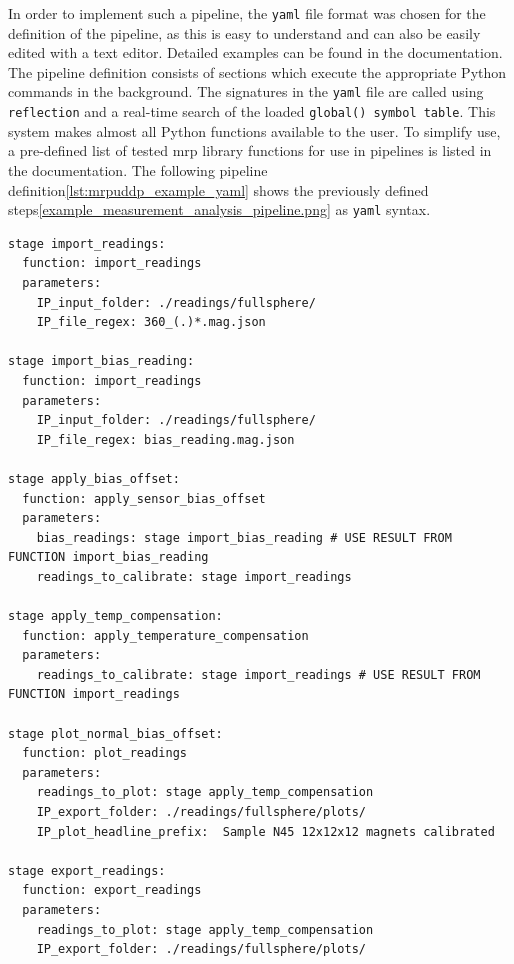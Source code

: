 In order to implement such a pipeline, the
\passthrough{\lstinline!yaml!} file format was chosen for the definition
of the pipeline, as this is easy to understand and can also be easily
edited with a text editor. Detailed examples can be found in the
documentation\cite{MagneticReadoutProcessingReadTheDocs}. The
pipeline definition consists of sections which execute the appropriate
Python commands in the background. The signatures in the
\passthrough{\lstinline!yaml!} file are called using
\passthrough{\lstinline!reflection!} and a real-time search of the
loaded
\passthrough{\lstinline!global() symbol table!}\cite{PythonGlobalSymbolTable}.
This system makes almost all Python functions available to the user. To
simplify use, a pre-defined list of tested \gls{mrp} library functions
for use in pipelines is listed in the
documentation\cite{MagneticReadoutProcessingReadTheDocs}. The
following pipeline definition\ref{lst:mrpuddp_example_yaml} shows the
previously defined steps\ref{example_measurement_analysis_pipeline.png}
as \passthrough{\lstinline!yaml!} syntax.

\begin{lstlisting}[caption={Example User Defined Processing Pipeline}, label=lst:mrpuddp_example_yaml]
stage import_readings:
  function: import_readings
  parameters:
    IP_input_folder: ./readings/fullsphere/
    IP_file_regex: 360_(.)*.mag.json

stage import_bias_reading:
  function: import_readings
  parameters:
    IP_input_folder: ./readings/fullsphere/
    IP_file_regex: bias_reading.mag.json

stage apply_bias_offset:
  function: apply_sensor_bias_offset
  parameters:
    bias_readings: stage import_bias_reading # USE RESULT FROM FUNCTION import_bias_reading
    readings_to_calibrate: stage import_readings

stage apply_temp_compensation:
  function: apply_temperature_compensation
  parameters:
    readings_to_calibrate: stage import_readings # USE RESULT FROM FUNCTION import_readings

stage plot_normal_bias_offset:
  function: plot_readings
  parameters:
    readings_to_plot: stage apply_temp_compensation
    IP_export_folder: ./readings/fullsphere/plots/
    IP_plot_headline_prefix:  Sample N45 12x12x12 magnets calibrated

stage export_readings:
  function: export_readings
  parameters:
    readings_to_plot: stage apply_temp_compensation
    IP_export_folder: ./readings/fullsphere/plots/
\end{lstlisting}

